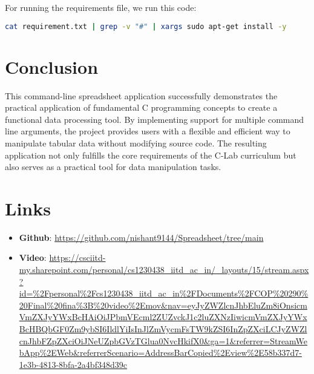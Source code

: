 \documentclass{article}
\begin{document}

For running the requirements file, we run this code:
\begin{lstlisting}[language=bash]
cat requirement.txt | grep -v "#" | xargs sudo apt-get install -y
\end{lstlisting}

\section{Conclusion}
This command-line spreadsheet application successfully demonstrates the practical application of fundamental C programming concepts to create a functional data processing tool.
By implementing support for multiple command line arguments, the project provides users
with a flexible and efficient way to manipulate tabular data without modifying source code.
The resulting application not only fulfills the core requirements of the C-Lab curriculum but
also serves as a practical tool for data manipulation tasks.

\section{Links}
\begin{itemize}
    \item \textbf{Github}: \url{https://github.com/nishant9144/Spreadsheet/tree/main}
    \item \textbf{Video}: \url{https://csciitd-my.sharepoint.com/personal/cs1230438_iitd_ac_in/_layouts/15/stream.aspx?id=%2Fpersonal%2Fcs1230438_iitd_ac_in%2FDocuments%2FCOP%20290%20Final%20fina%3B%20video%2Emov&nav=eyJyZWZlcnJhbEluZm8iOnsicmVmZXJyYWxBcHAiOiJPbmVEcml2ZUZvckJ1c2luZXNzIiwicmVmZXJyYWxBcHBQbGF0Zm9ybSI6IldlYiIsInJlZmVycmFsTW9kZSI6InZpZXciLCJyZWZlcnJhbFZpZXciOiJNeUZpbGVzTGlua0NvcHkifX0&ga=1&referrer=StreamWebApp%2EWeb&referrerScenario=AddressBarCopied%2Eview%2E58b337d7-1e3b-4813-8bfa-2a4bf348d39c}
\end{itemize}
\end{document}

